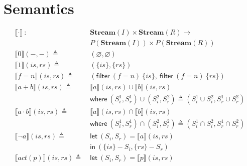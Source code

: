 \documentclass[12pt, letterpaper]{article}
\let\emptyset\varnothing
\newcommand\interp[1]{\llbracket #1 \rrbracket}
\begin{document}
\section{Semantics}
    \begin{align*}
        \interp{ \cdot }\ 
            :\ \ &
            \mathbf{Stream}(I)\times \mathbf{Stream}(R) \rightarrow \\
            & P(\mathbf{Stream}(I))\times P(\mathbf{Stream}(R)) 
            \\
        \interp{ 0 }(-, -)
            \triangleq\ &
            (\emptyset , \emptyset)
            \\ %
        \interp{ 1 }(\mathit{is}, \mathit{rs})
            \triangleq\ &
            (\{\mathit{is}\},\{\mathit{rs}\})
            \\
        \interp{ f=n }(\mathit{is}, \mathit{rs})
            \triangleq\ &
            (\mathsf{filter}\ (f=n)\ \{\mathit{is}\},\
             \mathsf{filter}\ (f=n)\ \{\mathit{rs}\}) 
            \\
        \interp{ a + b }(\mathit{is}, \mathit{rs})
            \triangleq\ &
            \interp { a }(\mathit{is}, \mathit{rs})\cup
            \interp { b }(\mathit{is}, \mathit{rs}) \\
            &\mathsf{where}\ (S_i^1, S_r^1)\cup (S_i^2, S_r^2)\triangleq
                (S_i^1\cup S_i^2, S_r^1\cup S_r^2)\\
        \interp { a \cdot b }(\mathit{is}, \mathit{rs})
            \triangleq\ &
            \interp { a }(\mathit{is}, \mathit{rs})\cap
            \interp { b }(\mathit{is}, \mathit{rs}) \\
            &\mathsf{where}\ (S_i^1, S_r^1)\cap (S_i^2, S_r^2)\triangleq
                (S_i^1\cap S_i^2, S_r^1\cap S_r^2)\\
        \interp { \neg a }(\mathit{is}, \mathit{rs})
            \triangleq\ &
            \mathsf{let}\ (S_i, S_r) = \interp {a}(\mathit{is}, \mathit{rs}) \\
            &\mathsf{in}\ (\{\mathit{is}\} - S_i, \{\mathit{rs}\} - S_r)
            \\
        \interp { act(p) }(\mathit{is}, \mathit{rs})
            \triangleq\ &
            \mathsf{let}\ (S_i,S_r) = \interp {p}(\mathit{is}, \mathit{rs})\ 

\end{align*}
\end{document}
